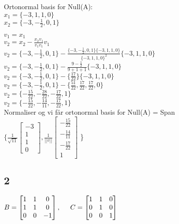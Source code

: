 \documentclass{article}
\begin{document}
Ortonormal basis for Null(A):\\
$x_{1} = \{-3,1,1,0\}$\\
$x_{2} = \{-3,-\frac{1}{2},0,1\}$

$v_{1} = x_{1}$\\
$v_{2} = x_{2} - \frac{x_{2}v_{1}}{v_{1}v_{1}}v_{1}$\\
$v_{2} = \{-3,-\frac{1}{2},0,1\} - \frac{ \{-3,-\frac{1}{2},0,1\}\{-3,1,1,0\}}{ \{-3,1,1,0\}^{2}}\{-3,1,1,0\}$\\
$v_{2} =  \{-3,-\frac{1}{2},0,1\} - \frac{9-\frac{1}{2}}{9+1+1}\{-3,1,1,0\}$\\
$v_{2} = \{-3,-\frac{1}{2},0,1\} - \{\frac{17}{22}\}\{-3,1,1,0\}$\\
$v_{2} = \{-3,-\frac{1}{2},0,1\} - \{\frac{51}{22}, \frac{17}{22}, \frac{17}{22}, 0\}$\\
$v_{2} = \{-\frac{15}{22}, -\frac{28}{22}, -\frac{17}{22}, 1\}$\\
$v_{2} = \{-\frac{15}{22}, -\frac{14}{11}, -\frac{17}{22}, 1\}$\\

Normaliser og vi får ortonormal basis for Null(A) = Span$\{\frac{1}{\sqrt{11}}
\left [
\begin{matrix}
    -3\\
    1\\
    1\\
    0
\end{matrix}
\right ],
\frac{1}{||v||}
\left [
\begin{matrix}
    -\frac{15}{22}\\
    -\frac{14}{11}\\
    -\frac{17}{22}\\
    1
\end{matrix}
\right ]
$
\}

\subsection*{2}

$B=
\left [
    \begin{matrix}
        1 & 1 & 0\\
        1 & 1 & 0\\
        0 & 0 & -1
    \end{matrix}
\right ]
, \hspace{5 mm}
C=
\left [
    \begin{matrix}
        1 & 1 & 0\\
        0 & 1 & 0\\
        0 & 0 & 1
    \end{matrix}
\right ]
$
\end{document}
